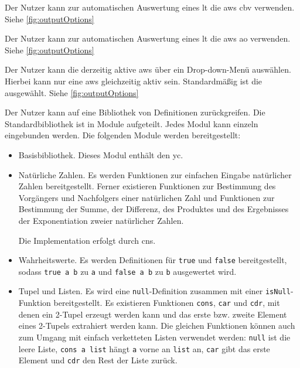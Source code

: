 \documentclass[parskip=full,11pt,twoside]{scrartcl}
\begin{document}
Der Nutzer kann zur automatischen Auswertung eines \gls{lt} die \gls{aws} \gls{cbv} verwenden. Siehe \cref{fig:outputOptions}

Der Nutzer kann zur automatischen Auswertung eines \gls{lt} die \gls{aws} \gls{ao} verwenden. Siehe \cref{fig:outputOptions}

Der Nutzer kann die derzeitig aktive \gls{aws} über ein Drop-down-Menü auswählen. Hierbei kann nur eine \gls{aws} gleichzeitig aktiv sein. Standardmäßig ist die  ausgewählt. Siehe \cref{fig:outputOptions}


Der Nutzer kann auf eine Bibliothek von Definitionen zurückgreifen. Die Standardbibliothek
ist in Module aufgeteilt. Jedes Modul kann einzeln eingebunden werden. Die folgenden
Module werden bereitgestellt:

\begin{itemize}
	\item Basisbibliothek. Dieses Modul enthält den \gls{yc}.

	\item Natürliche Zahlen. Es werden Funktionen zur einfachen Eingabe natürlicher
		Zahlen bereitgestellt. Ferner existieren Funktionen zur Bestimmung des Vorgängers
		und Nachfolgers einer natürlichen Zahl und Funktionen zur Bestimmung der Summe,
		der Differenz, des Produktes und des Ergebnisses der Exponentiation zweier
		natürlicher Zahlen.

		Die Implementation erfolgt durch \glspl{cn}.

	\item Wahrheitswerte. Es werden Definitionen für \texttt{true} und \texttt{false}
		bereitgestellt, sodass \texttt{true a b} zu \texttt{a} und \texttt{false a b}
		zu \texttt{b} ausgewertet wird.

	\item Tupel und Listen. Es wird eine \texttt{null}-Definition zusammen mit einer
		\texttt{isNull}-Funktion bereitgestellt. Es existieren Funktionen
		\texttt{cons}, \texttt{car} und \texttt{cdr}, %
		mit denen ein 2-Tupel erzeugt werden kann und das erste bzw. zweite Element
		eines 2-Tupels extrahiert werden kann. Die gleichen Funktionen können auch zum
		Umgang mit einfach verketteten Listen verwendet werden: \texttt{null} ist die
		leere Liste, \texttt{cons a list} hängt \texttt{a} vorne an \texttt{list} an,
		\texttt{car} gibt das erste Element und \texttt{cdr} den Rest der Liste zurück.

\end{itemize}
\end{document}
